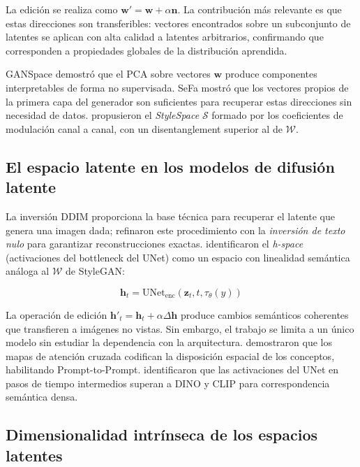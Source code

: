 \documentclass[12pt, a4paper, twoside]{book}
\newcommand{\z}{\mathbf{z}}
\begin{document}
La edición se realiza como $\mathbf{w}' = \mathbf{w} + \alpha\mathbf{n}$. La contribución más relevante es que estas direcciones son transferibles: vectores encontrados sobre un subconjunto de latentes se aplican con alta calidad a latentes arbitrarios, confirmando que corresponden a propiedades globales de la distribución aprendida.

GANSpace \citep{harkonen2020ganspace} demostró que el PCA sobre vectores $\mathbf{w}$ produce componentes interpretables de forma no supervisada. SeFa \citep{shen2021sefa} mostró que los vectores propios de la primera capa del generador son suficientes para recuperar estas direcciones sin necesidad de datos. \citet{wu2021stylespace} propusieron el \textit{StyleSpace} $\mathcal{S}$ formado por los coeficientes de modulación canal a canal, con un disentanglement superior al de $\mathcal{W}$.

\subsection{El espacio latente en los modelos de difusión latente}

La inversión DDIM \citep{song2021ddim} proporciona la base técnica para recuperar el latente que genera una imagen dada; \citet{mokady2023nulltext} refinaron este procedimiento con la \textit{inversión de texto nulo} para garantizar reconstrucciones exactas. \citet{kwon2023diffusion} identificaron el \textit{h-space} (activaciones del bottleneck del UNet) como un espacio con linealidad semántica análoga al $\mathcal{W}$ de StyleGAN:

\begin{equation}
\mathbf{h}_t = \text{UNet}_\text{enc}(\z_t, t, \tau_\theta(y))
\end{equation}

La operación de edición $\mathbf{h}'_t = \mathbf{h}_t + \alpha\Delta\mathbf{h}$ produce cambios semánticos coherentes que transfieren a imágenes no vistas. Sin embargo, el trabajo se limita a un único modelo sin estudiar la dependencia con la arquitectura. \citet{hertz2022p2p} demostraron que los mapas de atención cruzada codifican la disposición espacial de los conceptos, habilitando Prompt-to-Prompt. \citet{tang2023emergent} identificaron que las activaciones del UNet en pasos de tiempo intermedios superan a DINO y CLIP para correspondencia semántica densa.

\subsection{Dimensionalidad intrínseca de los espacios latentes}
\end{document}
